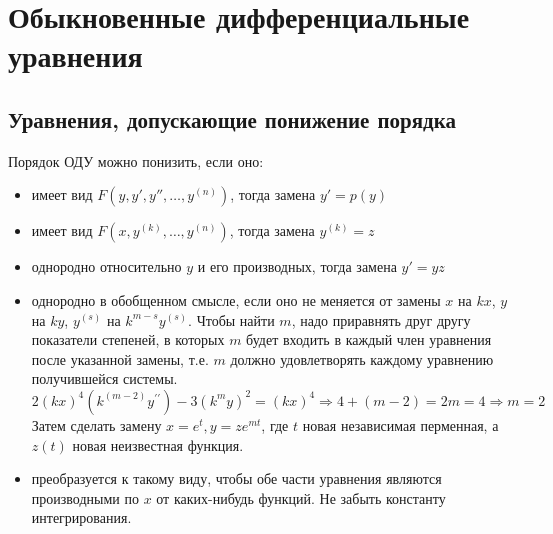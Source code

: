 \documentclass[twoside, a4paperpt, fleqn]{extarticle}
\begin{document}
    \section{Обыкновенные дифференциальные уравнения}
    \subsection{Уравнения, допускающие понижение порядка}
    Порядок ОДУ можно понизить, если оно:
    \begin{itemize}
        \item имеет вид $F(y, y', y'', \dots, y^{(n)})$, тогда замена $y' = p(y)$
        \item имеет вид $F(x, y^{(k)}, \dots, y^{(n)})$, тогда  замена $y^{(k)} = z$
        \item однородно относительно $y$ и его производных, тогда замена $y' = yz$
        \item однородно в обобщенном смысле, если оно не меняется от замены $x$ на $kx$, $y$ на $ky$, $y^{(s)}$ на $k^{m-s} y^{(s)}$. 
        Чтобы найти $m$, надо приравнять друг другу показатели степеней, в которых $m$ будет входить в каждый член уравнения после указанной замены, т.е. $m$ должно удовлетворять каждому уравнению получившейся системы.
        \begin{equation*}
            2(k x)^{4}\left(k^{(m-2)} y^{\prime \prime}\right)-3\left(k^{m} y\right)^{2}=(k x)^{4} \Rightarrow 4+(m-2)=2 m=4 \Rightarrow m=2
        \end{equation*}
        Затем сделать замену $x = e^t, y = z e^{mt}$, где $t$ новая независимая перменная, а $z(t)$ новая неизвестная функция.
        \item преобразуется к такому виду, чтобы обе части уравнения являются производными по $x$ от каких-нибудь функций. Не забыть константу интегрирования.
    \end{itemize}
\end{document}
